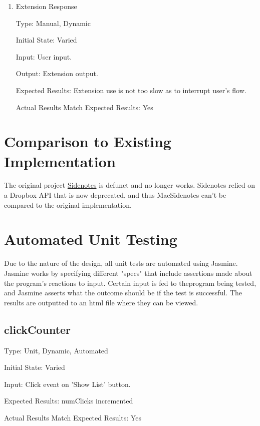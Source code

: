 \documentclass[12pt, titlepage]{article}
\begin{document}
\begin{enumerate}
	
	\item{Extension Response\\}
	
	Type: Manual, Dynamic
	
	Initial State: Varied
	
	Input: User input.
	
	Output: Extension output.
	
	Expected Results: Extension use is not too slow as to interrupt user's flow.
	
	Actual Results Match Expected Results: Yes
	
\end{enumerate}
	
\section{Comparison to Existing Implementation}	

The original project 
\href{https://github.com/sidenotes/sidenotes}{Sidenotes} is defunct and no 
longer works. Sidenotes relied on a Dropbox API that is now deprecated, and 
thus MacSidenotes can't be compared to the original implementation.

\section{Automated Unit Testing}

Due to the nature of the design, all unit tests are automated using Jasmine. 
Jasmine works by specifying different "specs" that include assertions made 
about the program's reactions to input. Certain input is fed to theprogram 
being tested, and Jasmine asserts what the outcome should be if the test is 
successful. The results are outputted to an html file where they can be viewed.



\subsection{clickCounter}

	Type: Unit, Dynamic, Automated

	Initial State: Varied

	Input: Click event on 'Show List' button.

	Expected Results: numClicks incremented

	Actual Results Match Expected Results: Yes
	
\end{document}

